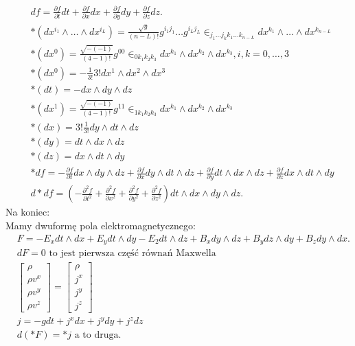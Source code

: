 \documentclass[../main.tex]{subfiles}
\begin{document}
        \begin{align*}
            &df = \frac{\partial f}{\partial t} dt + \frac{\partial f}{\partial x} dx + \frac{\partial f}{\partial y} dy + \frac{\partial f}{\partial z} dz.\\
            &\ast\left( dx^{i_1}\land \ldots \land dx^{i_L} \right) = \frac{\sqrt{g} }{(n-L)!} g^{i_1j_1}\ldots g^{i_Lj_L}\in_{j_1\ldots j_kk_1\ldots k_{n-L}}dx^{k_1}\land\ldots\land dx^{k_{n-L}}\\
            & \ast(dx^0) = \frac{\sqrt{-(-1)} }{(4-1)!}g^{0 0}\in_{0k_1k_2k_3}dx^{k_1}\land dx^{k_2}\land dx^{k_3}, i,k = 0,\ldots,3\\
            &\ast(dx^0) = -\frac{1}{3!} 3! dx^1\land dx^2\land dx^3\\
            &\ast(dt) = -dx\land dy\land dz\\
            &\ast(dx^1) = \frac{\sqrt{-(-1)} }{(4-1)!} g^{1 1}\in_{1k_1k_2k_3}dx^{k_1}\land dx^{k_2}\land dx^{k_3}\\
            &\ast(dx) = 3! \frac{1}{3!}dy\land dt\land dz\\
            &\ast(dy) = dt\land dx\land dz\\
            &\ast(dz) = dx\land dt\land dy\\
            &\ast df = -\frac{\partial f}{\partial t} dx\land dy\land dz + \frac{\partial f}{\partial x} dy\land dt\land dz + \frac{\partial f}{\partial y} dt\land dx\land dz + \frac{\partial f}{\partial z} dx\land dt\land dy\\
            &d\ast d f =\left( -\frac{\partial ^2f}{\partial t^2} + \frac{\partial ^2f}{\partial x^2} + \frac{\partial ^2f}{\partial y^2} + \frac{\partial ^2f}{\partial z^2}   \right)dt\land dx\land dy\land dz
        .\end{align*}
        Na koniec:\\
        Mamy dwuformę pola elektromagnetycznego:
        \begin{align*}
            &F = -E_x dt\land dx + E_y dt\land dy - E_2 dt\land dz + B_x dy\land dz + B_y dz\land dy + B_z dy\land dx.\\
            &dF = 0 \text{ to jest pierwsza część równań Maxwella}\\
            &\begin{bmatrix} \rho\\ \rho v^x\\ \rho v^y\\ \rho v^z \end{bmatrix} = \begin{bmatrix} \rho\\ j^x\\ j^y\\ j^z \end{bmatrix}\\
            &j=-gdt + j^xdx+j^ydy+j^zdz\\
            &d(\ast F) = \ast j \text{ a to druga}
        .\end{align*}
\end{document}
